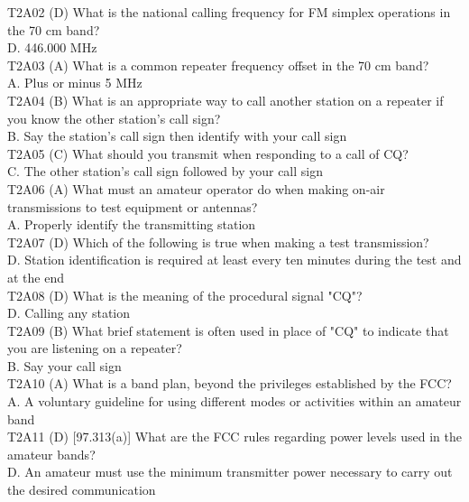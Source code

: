 \documentclass[12pt,letterpaper]{report}
\begin{document}
T2A02 (D) What is the national calling frequency for FM simplex operations in the 70 cm band?\\
D. 446.000 MHz\\

T2A03 (A) What is a common repeater frequency offset in the 70 cm band?\\
A. Plus or minus 5 MHz\\

T2A04 (B) What is an appropriate way to call another station on a repeater if you know the other station's call sign?\\
B. Say the station's call sign then identify with your call sign\\

T2A05 (C) What should you transmit when responding to a call of CQ?\\
C. The other station's call sign followed by your call sign\\

T2A06 (A) What must an amateur operator do when making on-air transmissions to test equipment or antennas?\\
A. Properly identify the transmitting station\\

T2A07 (D) Which of the following is true when making a test transmission?\\
D. Station identification is required at least every ten minutes during the test and at the end\\

T2A08 (D) What is the meaning of the procedural signal "CQ"?\\
D. Calling any station\\

T2A09 (B) What brief statement is often used in place of "CQ" to indicate that you are listening on a repeater?\\
B. Say your call sign  \\

T2A10 (A) What is a band plan, beyond the privileges established by the FCC?\\
A. A voluntary guideline for using different modes or activities within an amateur band\\

T2A11 (D) [97.313(a)] What are the FCC rules regarding power levels used in the amateur bands?\\
D. An amateur must use the minimum transmitter power necessary to carry out the desired communication\\
\end{document}
